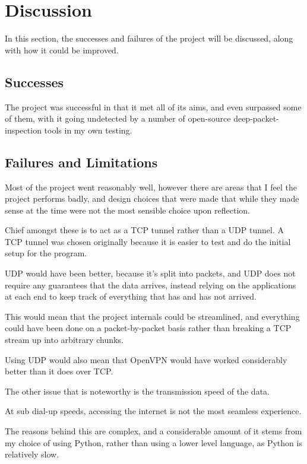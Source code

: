 \section{Discussion}
In this section, the successes and failures of the project will be discussed, along with how it could be improved.
\subsection{Successes}
The project was successful in that it met all of its aims, and even surpassed some of them, with it going undetected by a number of open-source deep-packet-inspection tools in my own testing.

\subsection{Failures and Limitations}
Most of the project went reasonably well, however there are areas that I feel the project performs badly, and design choices that were made that while they made sense at the time were not the most sensible choice upon reflection.\par
Chief amongst these is to act as a TCP tunnel rather than a UDP tunnel. A TCP tunnel was chosen originally because it is easier to test and do the initial setup for the program.\par
UDP would have been better, because it's split into packets, and UDP does not require any guarantees that the data arrives, instead relying on the applications at each end to keep track of everything that has and has not arrived.\par
This would mean that the project internals could be streamlined, and everything could have been done on a packet-by-packet basis rather than breaking a TCP stream up into arbitrary chunks.\par
Using UDP would also mean that OpenVPN would have worked considerably better than it does over TCP\@.\par
The other issue that is noteworthy is the transmission speed of the data.\par
At sub dial-up speeds, accessing the internet is not the most seamless experience.\par
The reasons behind this are complex, and a considerable amount of it stems from my choice of using Python, rather than using a lower level language, as Python is relatively slow.
